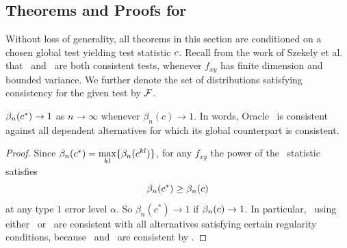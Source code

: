 \documentclass[11pt]{article}
\begin{document}
\subsection{Theorems and Proofs for \Mgc}
\label{appen:theory}

Without loss of generality, all theorems in this section are conditioned on a chosen global test yielding test statistic $c$.
Recall from the work of Szekely et al. that \Dcorr~and \Mcorr~are both consistent tests, whenever $f_{xy}$ has finite dimension and bounded variance. We further denote the set of distributions satisfying consistency for the given test by $\mathcal{F}$.
\begin{thm}
\label{t:thm1}
$\beta_n(c^*) \rightarrow 1$ as $n \to \infty$ whenever $\beta_n(c) \rightarrow 1$.
In words, Oracle \Mgc~is consistent against all dependent alternatives for which its global counterpart is consistent. 
\end{thm}
\begin{proof}
Since $\beta_n(c^*)=\underset{kl}{\max}\{\beta_n(c^{kl})\}$, for any $f_{xy}$ the power of the \Mgc~statistic satisfies
\begin{equation*}
\beta_n(c^*) \geq \beta_n(c)
\end{equation*}
at any type $1$ error level $\alpha$. So $\beta_n(c^*) \rightarrow 1$ if $\beta_n(c) \rightarrow 1$.
In particular, \Mgc~using either \Dcorr~or \Mcorr~are consistent with all alternatives satisfying certain regularity conditions, because \Dcorr~and \Mcorr~are consistent by \cite{SzekelyRizzoBakirov2007, SzekelyRizzo2013a}. 
\end{proof}
\end{document}
